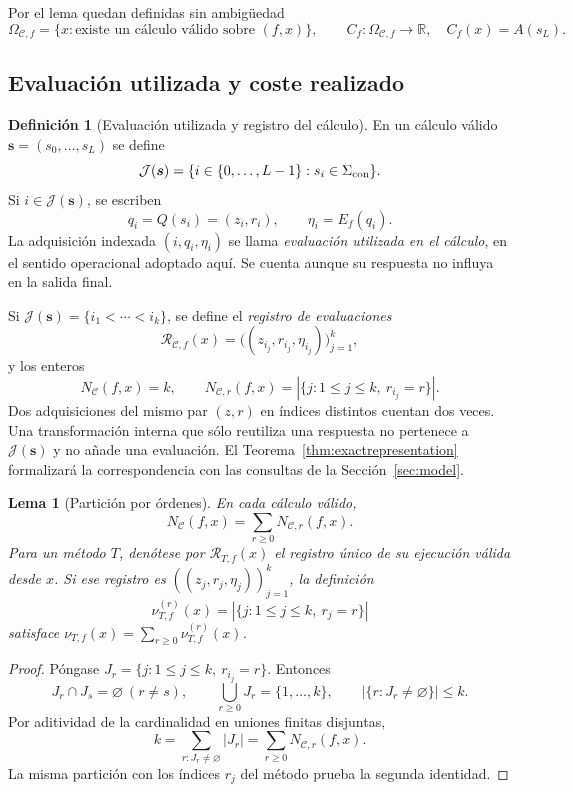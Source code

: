 \documentclass[11pt,a4paper]{article}
\numberwithin{equation}{section}
\newtheorem{lemma}[theorem]{Lema}
\theoremstyle{definition}
\newtheorem{definition}[theorem]{Definición}
\theoremstyle{remark}
\newcommand{\R}{\mathbb R}
\newcommand{\Rec}{\mathcal R}
\begin{document}
Por el lema quedan definidas sin ambigüedad
\[
\Omega_{\mathscr C,f}=\{x:\text{existe un cálculo válido sobre }(f,x)\},
\qquad C_f:\Omega_{\mathscr C,f}\longrightarrow\R,\quad C_f(x)=A(s_L).
\]

\subsection{Evaluación utilizada y coste realizado}
\begin{definition}[Evaluación utilizada y registro del cálculo]\label{def:used}
En un cálculo válido $\boldsymbol s=(s_0,\ldots,s_L)$ se define
\[
\mathcal J(\boldsymbol s)=\{i\in\{0,\ldots,L-1\}:s_i\in\Sigma_{\rm con}\}.
\]
Si $i\in\mathcal J(\boldsymbol s)$, se escriben
\[
q_i=Q(s_i)=(z_i,r_i),\qquad \eta_i=E_f(q_i).
\]
La adquisición indexada $(i,q_i,\eta_i)$ se llama \emph{evaluación utilizada en el cálculo}, en el sentido operacional adoptado aquí. Se cuenta aunque su respuesta no influya en la salida final.

Si $\mathcal J(\boldsymbol s)=\{i_1<\cdots<i_k\}$, se define el \emph{registro de evaluaciones}
\[
\Rec_{\mathscr C,f}(x)=\bigl((z_{i_j},r_{i_j},\eta_{i_j})\bigr)_{j=1}^k,
\]
y los enteros
\[
N_{\mathscr C}(f,x)=k,\qquad
N_{\mathscr C,r}(f,x)=|\{j:1\le j\le k,\ r_{i_j}=r\}|.
\]
Dos adquisiciones del mismo par $(z,r)$ en índices distintos cuentan dos veces. Una transformación interna que sólo reutiliza una respuesta no pertenece a $\mathcal J(\boldsymbol s)$ y no añade una evaluación. El Teorema~\ref{thm:exactrepresentation} formalizará la correspondencia con las consultas de la Sección~\ref{sec:model}.
\end{definition}

\begin{lemma}[Partición por órdenes]\label{lem:countpartition}
En cada cálculo válido,
\begin{equation}\label{eq:countpartition}
N_{\mathscr C}(f,x)=\sum_{r\ge0}N_{\mathscr C,r}(f,x).
\end{equation}
Para un método $T$, denótese por $\Rec_{T,f}(x)$ el registro único de su ejecución válida desde $x$. Si ese registro es $((z_j,r_j,\eta_j))_{j=1}^k$, la definición
\[
\nu^{(r)}_{T,f}(x)=|\{j:1\le j\le k,\ r_j=r\}|
\]
satisface $\nu_{T,f}(x)=\sum_{r\ge0}\nu^{(r)}_{T,f}(x)$.
\end{lemma}
\begin{proof}
Póngase $J_r=\{j:1\le j\le k,\ r_{i_j}=r\}$. Entonces
\[
J_r\cap J_s=\varnothing\ (r\ne s),\qquad
\bigcup_{r\ge0}J_r=\{1,\ldots,k\},\qquad
|\{r:J_r\ne\varnothing\}|\le k.
\]
Por aditividad de la cardinalidad en uniones finitas disjuntas,
\[
k=\sum_{r:J_r\ne\varnothing}|J_r|=\sum_{r\ge0}N_{\mathscr C,r}(f,x).
\]
La misma partición con los índices $r_j$ del método prueba la segunda identidad.
\end{proof}
\end{document}
